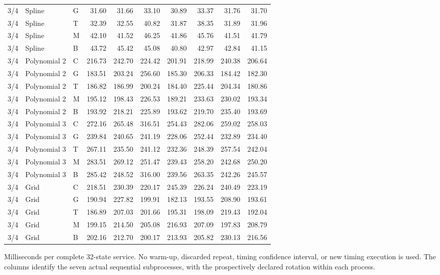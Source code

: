 \begin{longtable}{lllrrrrrrr}
3/4 & Spline & G & 31.60 & 31.66 & 33.10 & 30.89 & 33.37 & 31.76 & 31.70 \\
3/4 & Spline & T & 32.39 & 32.55 & 40.82 & 31.87 & 38.35 & 31.89 & 31.96 \\
3/4 & Spline & M & 42.10 & 41.52 & 46.25 & 41.86 & 45.76 & 41.51 & 41.79 \\
3/4 & Spline & B & 43.72 & 45.42 & 45.08 & 40.80 & 42.97 & 42.84 & 41.15 \\
3/4 & Polynomial 2 & C & 216.73 & 242.70 & 224.42 & 201.91 & 218.99 & 240.38 & 206.64 \\
3/4 & Polynomial 2 & G & 183.51 & 203.24 & 256.60 & 185.30 & 206.33 & 184.42 & 182.30 \\
3/4 & Polynomial 2 & T & 186.82 & 186.99 & 200.24 & 184.40 & 225.44 & 204.34 & 180.86 \\
3/4 & Polynomial 2 & M & 195.12 & 198.43 & 226.53 & 189.21 & 233.63 & 230.02 & 193.34 \\
3/4 & Polynomial 2 & B & 193.92 & 218.21 & 225.89 & 193.62 & 219.70 & 235.40 & 193.69 \\
3/4 & Polynomial 3 & C & 272.16 & 265.48 & 316.51 & 254.43 & 282.06 & 259.02 & 258.03 \\
3/4 & Polynomial 3 & G & 239.84 & 240.65 & 241.19 & 228.06 & 252.44 & 232.89 & 234.40 \\
3/4 & Polynomial 3 & T & 267.11 & 235.50 & 241.12 & 232.36 & 248.39 & 257.54 & 242.04 \\
3/4 & Polynomial 3 & M & 283.51 & 269.12 & 251.47 & 239.43 & 258.20 & 242.68 & 250.20 \\
3/4 & Polynomial 3 & B & 285.42 & 248.52 & 316.00 & 239.56 & 263.35 & 242.26 & 245.57 \\
3/4 & Grid & C & 218.51 & 230.39 & 220.17 & 245.39 & 226.24 & 240.49 & 223.19 \\
3/4 & Grid & G & 190.94 & 227.82 & 199.91 & 182.13 & 193.55 & 208.90 & 193.61 \\
3/4 & Grid & T & 186.89 & 207.03 & 201.66 & 195.31 & 198.09 & 219.43 & 192.04 \\
3/4 & Grid & M & 199.15 & 214.50 & 205.08 & 216.93 & 207.09 & 197.83 & 208.79 \\
3/4 & Grid & B & 202.16 & 212.70 & 200.17 & 213.93 & 205.82 & 230.13 & 216.56 \\
\end{longtable}
\noindent Milliseconds per complete 32-state service. No warm-up, discarded repeat, timing confidence interval, or new timing execution is used. The columns identify the seven actual sequential subprocesses, with the prospectively declared rotation within each process.
\endgroup
